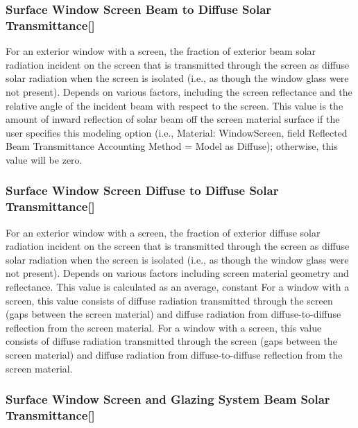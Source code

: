 \subsubsection{Surface Window Screen Beam to Diffuse Solar Transmittance{[]}}\label{surface-window-screen-beam-to-diffuse-solar-transmittance}

For an exterior window with a screen, the fraction of exterior beam solar radiation incident on the screen that is transmitted through the screen as diffuse solar radiation when the screen is isolated (i.e., as though the window glass were not present). Depends on various factors, including the screen reflectance and the relative angle of the incident beam with respect to the screen. This value is the amount of inward reflection of solar beam off the screen material surface if the user specifies this modeling option (i.e., Material: WindowScreen, field Reflected Beam Transmittance Accounting Method = Model as Diffuse); otherwise, this value will be zero.

\subsubsection{Surface Window Screen Diffuse to Diffuse Solar Transmittance{[]}}\label{surface-window-screen-diffuse-to-diffuse-solar-transmittance}

For an exterior window with a screen, the fraction of exterior diffuse solar radiation incident on the screen that is transmitted through the screen as diffuse solar radiation when the screen is isolated (i.e., as though the window glass were not present). Depends on various factors including screen material geometry and reflectance. This value is calculated as an average, constant For a window with a screen, this value consists of diffuse radiation transmitted through the screen (gaps between the screen material) and diffuse radiation from diffuse-to-diffuse reflection from the screen material. For a window with a screen, this value consists of diffuse radiation transmitted through the screen (gaps between the screen material) and diffuse radiation from diffuse-to-diffuse reflection from the screen material.

\subsubsection{Surface Window Screen and Glazing System Beam Solar Transmittance{[]}}\label{surface-window-screen-and-glazing-system-beam-solar-transmittance}

